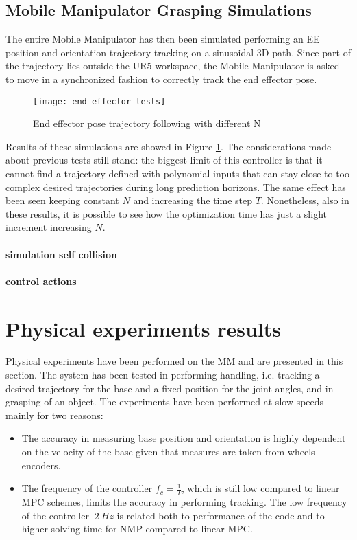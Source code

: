 \subsection{Mobile Manipulator Grasping Simulations}
The entire Mobile Manipulator has then been simulated performing an EE position and orientation trajectory tracking on a sinusoidal 3D path. Since part of the trajectory lies outside the UR5 workspace, the Mobile Manipulator is asked to move in a synchronized fashion to correctly track the end effector pose. 
\begin{figure}[h!]
	\centering
	\texttt{[image: end\_effector\_tests]}
	\caption{End effector pose trajectory following with different N }
	\label{end_effector_tests}
\end{figure}
Results of these simulations are showed in Figure \ref{end_effector_tests}. The considerations made about previous tests still stand: the biggest limit of this controller is that it cannot find a trajectory defined with polynomial inputs that can stay close to too complex desired trajectories during long prediction horizons. The same effect has been seen keeping constant $N$ and increasing the time step $T$. Nonetheless, also in these results, it is possible to see how the optimization time has just a slight increment increasing $N$.


\paragraph{simulation self collision}
\paragraph{control actions}



\section{Physical experiments results}
	Physical experiments have been performed on the MM and are presented in this section. The system has been tested in performing handling, i.e. tracking a desired trajectory for the base and a fixed position for the joint angles, and in grasping of an object. The experiments have been performed at slow speeds mainly for two reasons: \\
	\begin{itemize}
	\item The accuracy in measuring base position and orientation is highly dependent on the velocity of the base given that measures are taken from wheels encoders.
	\item The frequency of the controller $f_c=\frac{1}{T}$, which is still low compared to linear MPC schemes, limits the accuracy in performing tracking. The low frequency of the controller $~2\ Hz$ is related both to performance of the code and to higher solving time for NMP compared to linear MPC. 
	\end{itemize} 

